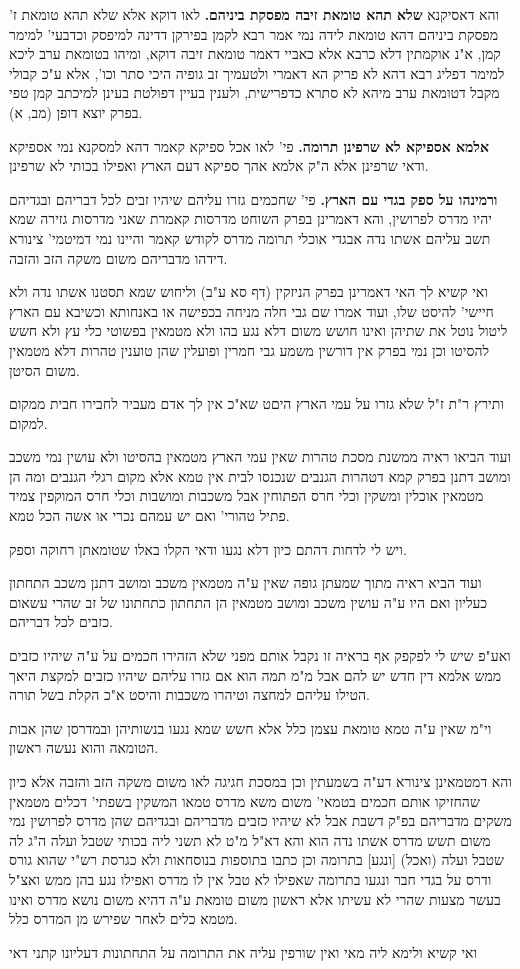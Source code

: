 \documentclass[12pt, openany]{book}
\newcommand{\sethebfont}{
\fontsize{10.5pt}{21.0pt} \selectfont
}
\newcommand{\twocol}[1]{
	{\sethebfont \begin{multicols}{2}
			#1
	\end{multicols}}	
}
\begin{document}
\twocol{ והא דאסיקנא \textbf{שלא תהא טומאת זיבה מפסקת ביניהם.}  לאו דוקא אלא שלא תהא טומאת ז' מפסקת ביניהם דהא טומאת לידה נמי אמר רבא לקמן בפירקן דדינה למיפסק וכדבעי' למימר קמן, א"נ אוקמתין דלא כרבא אלא כאביי דאמר טומאת זיבה דוקא, ומיהו בטומאת ערב ליכא למימר דפליג רבא דהא לא פריק הא דאמרי ולטעמיך זב גופיה היכי סתר וכו', אלא ע"כ קבולי מקבל דטומאת ערב מיהא לא סתרא כדפרישית, ולענין בעיין דפולטת בעינן למיכתב קמן טפי בפרק יוצא דופן (מב, א). 
\par\textbf{אלמא אספיקא לא שרפינן תרומה.}  פי' לאו אכל ספיקא קאמר דהא למסקנא נמי אספיקא ודאי שרפינן אלא ה"ק אלמא אהך ספיקא דעם הארץ ואפילו בכותי לא שרפינן. 
\par\textbf{ורמינהו על ספק בגדי עם הארץ.}  פי' שחכמים גזרו עליהם שיהיו זבים לכל דבריהם ובגדיהם יהיו מדרס לפרושין, והא דאמרינן בפרק השוחט מדרסות קאמרת שאני מדרסות גזירה שמא תשב עליהם אשתו נדה אבגדי אוכלי תרומה מדרס לקודש קאמר והיינו נמי דמיטמי' צינורא דידהו מדבריהם משום משקה הזב והזבה.\par ואי קשיא לך האי דאמרינן בפרק הניזקין (דף סא ע"ב) וליחוש שמא תסטנו אשתו נדה ולא חיישי' להיסט שלו, ועוד אמרו שם גבי חלה מניחה בכפישה או באנחותא וכשיבא עם הארץ ליטול נוטל את שתיהן ואינו חושש משום דלא נגע בהו ולא מטמאין בפשוטי כלי עץ ולא חשש להסיטו וכן נמי בפרק אין דורשין משמע גבי חמרין ופועלין שהן טוענין טהרות דלא מטמאין משום הסיטן.\par ותירץ ר"ת ז"ל שלא גזרו על עמי הארץ היםט שא"כ אין לך אדם מעביר לחבירו חבית ממקום למקום.\par ועוד הביאו ראיה ממשנת מסכת טהרות שאין עמי הארץ מטמאין בהסיטו ולא עושין נמי משכב ומושב דתנן בפרק קמא דטהרות הגנבים שנכנסו לבית אין טמא אלא מקום רגלי הגנבים ומה הן מטמאין אוכלין ומשקין וכלי חרס הפתוחין אבל משכבות ומושבות וכלי חרס המוקפין צמיד פתיל טהורי' ואם יש עמהם נכרי או אשה הכל טמא.\par  ויש לי לדחות דהתם כיון דלא נגעו ודאי הקלו באלו שטומאתן רחוקה וספק.\par  ועוד הביא ראיה מתוך שמעתן גופה שאין ע"ה מטמאין משכב ומושב דתנן משכב התחתון כעליון ואם היו ע"ה עושין משכב ומושב מטמאין הן התחתון כתחתונו של זב שהרי עשאום כזבים לכל דבריהם.\par  ואע"פ שיש לי לפקפק אף בראיה זו נקבל אותם מפני שלא הזהירו חכמים על ע"ה שיהיו כזבים ממש אלמא דין חדש יש להם אבל מ"מ תמה הוא אם גזרו עליהם שיהיו כזבים למקצת היאך הטילו עליהם למחצה וטיהרו משכבות והיסט א"כ הקלת בשל תורה.\par וי"מ שאין ע"ה טמא טומאת עצמן כלל אלא חשש שמא נגעו בנשותיהן ובמדרסן שהן אבות הטומאה והוא נעשה ראשון.\par  והא דמטמאינן צינורא דע"ה בשמעתין וכן במסכת חגיגה לאו משום משקה הזב והזבה אלא כיון שהחזיקו אותם חכמים בטמאי' משום משא מדרס טמאו המשקין בשפתי' דכלים מטמאין משקים מדבריהם בפ"ק דשבת אבל לא שיהיו כזבים מדבריהם ובגדיהם שהן מדרס לפרושין נמי משום תשש מדרס אשתו נדה הוא והא דא"ל מ"ט לא תשני ליה בכותי שטבל ועלה ה"ג לה שטבל ועלה (ואכל) [ונגע] בתרומה וכן כתבו בתוספות בנוסחאות ולא כגרסת רש"י שהוא גורס ודרס על בגדי חבר ונגעו בתרומה שאפילו לא טבל אין לו מדרס ואפילו נגע בהן ממש ואצ"ל בעשר מצעות שהרי לא עשיתו אלא ראשון משום טומאת ע"ה דהיא משום נושא מדרס ואינו מטמא כלים לאחר שפירש מן המדרס כלל.\par  ואי קשיא ולימא ליה מאי ואין שורפין עליה את התרומה על התחתונות דעליונו קתני דאי }
\end{document}
